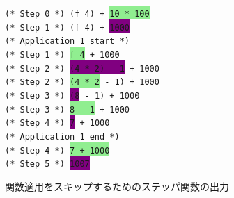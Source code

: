 \begin{figure}
\texttt{(* Step 0 *) (f 4) + \colorbox{lightgreen}{10 * 100}\\
(* Step 1 *) (f 4) + \colorbox{purple}{1000}\\
(* Application 1 start *)\\
(* Step 1 *) \colorbox{lightgreen}{f 4} + 1000\\
(* Step 2 *) \colorbox{purple}{(4 * 2) - 1} + 1000\\
(* Step 2 *) \colorbox{lightgreen}{(4 * 2} - 1) + 1000\\
(* Step 3 *) \colorbox{purple}{(8} - 1) + 1000\\
(* Step 3 *) \colorbox{lightgreen}{8 - 1} + 1000\\
(* Step 4 *) \colorbox{purple}{7} + 1000\\
(* Application 1 end *)\\
(* Step 4 *) \colorbox{lightgreen}{7 + 1000}\\
(* Step 5 *) \colorbox{purple}{1007}}
\caption{関数適用をスキップするためのステッパ関数の出力}
\label{figure:skipping}
\end{figure}
